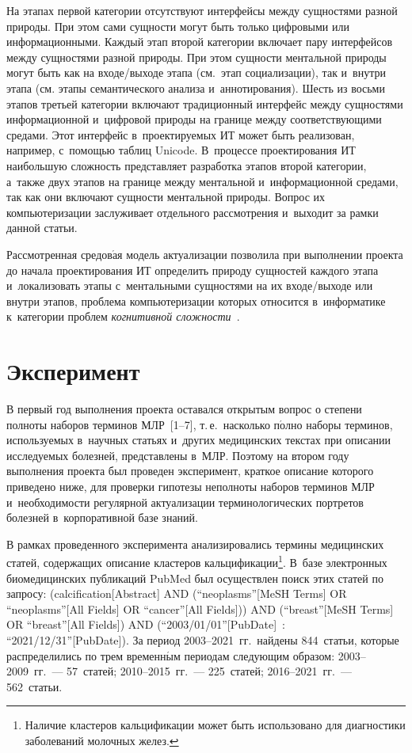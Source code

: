 \begin{multicols}{2}
  На этапах первой категории отсутствуют интерфейсы между сущностями 
разной природы. При этом сами сущности могут быть только цифровыми 
или информационными. Каждый этап второй категории включает пару 
интерфейсов между сущностями разной природы. При этом сущности 
ментальной природы могут быть как на вхо\-де/вы\-хо\-де этапа (см.\ этап 
социализации), так и~внутри этапа (см. этапы семантического анализа 
и~аннотирования). Шесть из восьми этапов третьей категории включают 
традиционный интерфейс между сущностями информационной и~цифровой 
природы на границе между соответствующими средами. Этот интерфейс 
в~проектируемых ИТ может быть реализован, например, с~по\-мощью  
таб\-лиц Unicode. В~процессе проектирования ИТ наибольшую сложность 
представляет разработка этапов второй категории, а~также двух этапов на 
границе между ментальной и~информационной средами, так как они 
включают сущности ментальной природы. Вопрос их компьютеризации 
заслуживает отдельного рассмотрения и~выходит за рамки данной статьи.
  
  Рассмотренная средов$\acute{\mbox{а}}$я модель актуализации позволила 
при выполнении проекта до начала проектирования ИТ определить природу 
сущностей каж\-до\-го этапа и~локализовать этапы с~ментальными сущностями 
на их вхо\-де/вы\-хо\-де или внутри этапов, проб\-ле\-ма компьютеризации 
которых относится в~информатике к~категории проблем \textit{когнитивной 
сложности}~\cite{14-zz, 19-zz}.

\section{Эксперимент}

  В первый год выполнения проекта оставался открытым вопрос о степени 
полноты наборов терминов МЛР~[1--7], т.\,е.\ насколько п$\acute{\mbox{о}}$лно наборы 
терминов, используемых в~научных статьях и~других медицинских текстах 
при описании исследуемых болезней, представлены в~МЛР. Поэтому на 
втором году выполнения проекта был проведен эксперимент, краткое 
описание которого приведено ниже, для проверки гипотезы неполноты 
наборов терминов МЛР и~необходимости регулярной актуализации 
терминологических портретов болезней в~корпоративной базе знаний.
  
  В рамках проведенного эксперимента анализировались термины 
медицинских статей, содержащих описание кластеров 
кальцификации\footnote{Наличие кластеров кальцификации может быть использовано для 
диагностики заболеваний молочных желез.}. В~базе электронных биомедицинских 
публикаций PubMed был осуществлен поиск этих статей по запросу: 
(calcification[Abstract] AND (``neoplasms''[MeSH Terms] OR ``neoplasms''[All 
Fields] OR ``cancer''[All Fields])) AND (``breast''[MeSH Terms] OR ``breast''[All 
Fields]) AND (``2003/01/01''[PubDate]~: ``2021/12/31''[PubDate]). За период 
2003--2021~гг.\ найдены 844~статьи, которые распределились по трем 
временн$\acute{\mbox{ы}}$м периодам следующим образом: 2003--2009~гг.~--- 57~статей; 
2010--2015~гг.~--- 225~статей; 2016--2021~гг.~--- 562~статьи.
  

\end{multicols}
